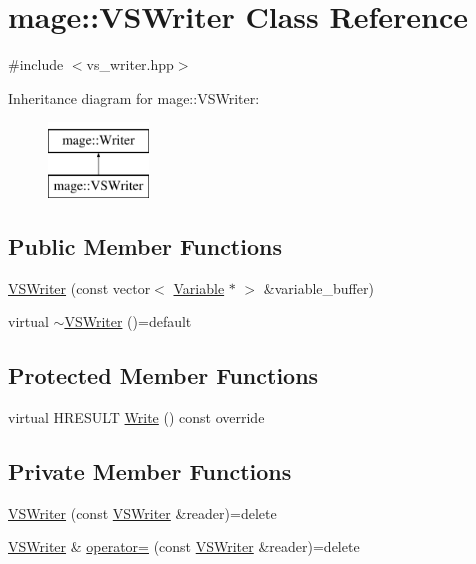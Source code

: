 \hypertarget{classmage_1_1_v_s_writer}{}\section{mage\+:\+:V\+S\+Writer Class Reference}
\label{classmage_1_1_v_s_writer}


{\ttfamily \#include $<$vs\+\_\+writer.\+hpp$>$}

Inheritance diagram for mage\+:\+:V\+S\+Writer\+:\begin{figure}[H]
\begin{center}
\leavevmode
\includegraphics[height=2.000000cm]{classmage_1_1_v_s_writer}
\end{center}
\end{figure}
\subsection*{Public Member Functions}
\begin{DoxyCompactItemize}
\item 
\hyperlink{classmage_1_1_v_s_writer_a401e3661cf197c20a011792221443e8f}{V\+S\+Writer} (const vector$<$ \hyperlink{structmage_1_1_variable}{Variable} $\ast$ $>$ \&variable\+\_\+buffer)
\item 
virtual \hyperlink{classmage_1_1_v_s_writer_ac2268dde1a58f0d1d657e584e33e82fe}{$\sim$\+V\+S\+Writer} ()=default
\end{DoxyCompactItemize}
\subsection*{Protected Member Functions}
\begin{DoxyCompactItemize}
\item 
virtual H\+R\+E\+S\+U\+LT \hyperlink{classmage_1_1_v_s_writer_afda5e71bc0c5c836ab439e2572dcd685}{Write} () const override
\end{DoxyCompactItemize}
\subsection*{Private Member Functions}
\begin{DoxyCompactItemize}
\item 
\hyperlink{classmage_1_1_v_s_writer_ac832695702725d55e8b5ded2917758d9}{V\+S\+Writer} (const \hyperlink{classmage_1_1_v_s_writer}{V\+S\+Writer} \&reader)=delete
\item 
\hyperlink{classmage_1_1_v_s_writer}{V\+S\+Writer} \& \hyperlink{classmage_1_1_v_s_writer_a3c961e3ef27f93b5ecf953c81844f6c6}{operator=} (const \hyperlink{classmage_1_1_v_s_writer}{V\+S\+Writer} \&reader)=delete
\end{DoxyCompactItemize}
